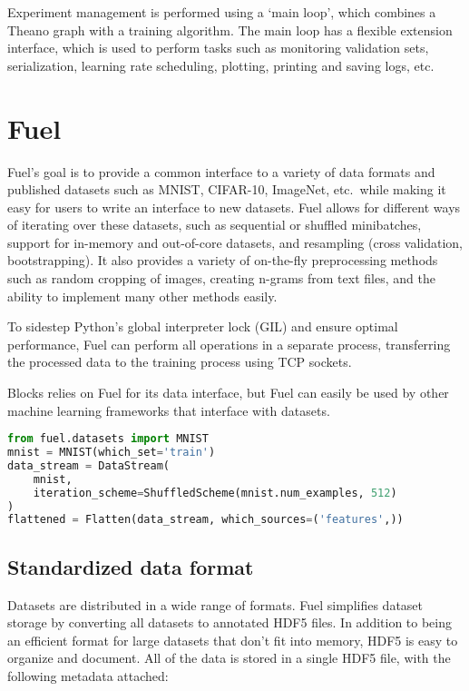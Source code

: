 \documentclass[twoside,11pt]{article}
\begin{document}
Experiment management is performed using a `main loop', which combines a Theano
graph with a training algorithm. The main loop has a flexible extension
interface, which is used to perform tasks such as monitoring validation sets,
serialization, learning rate scheduling, plotting, printing and saving logs,
etc.

\section{Fuel}

Fuel's goal is to provide a common interface to a variety of data formats and
published datasets such as MNIST, CIFAR-10, ImageNet, etc.\ while making it easy
for users to write an interface to new datasets. Fuel allows for different ways
of iterating over these datasets, such as sequential or shuffled minibatches,
support for in-memory and out-of-core datasets, and resampling (cross
validation, bootstrapping). It also provides a variety of on-the-fly
preprocessing methods such as random cropping of images, creating n-grams from
text files, and the ability to implement many other methods easily.

To sidestep Python's global interpreter lock (GIL) and ensure optimal
performance, Fuel can perform all operations in a separate process,
transferring the processed data to the training process using TCP sockets.

Blocks relies on Fuel for its data interface, but Fuel can easily be used by
other machine learning frameworks that interface with datasets.

\begin{lstlisting}[language=Python,basicstyle=\ttfamily,caption=Iterating over flattened MNIST features in shuffled batches]
from fuel.datasets import MNIST
mnist = MNIST(which_set='train')
data_stream = DataStream(
    mnist,
    iteration_scheme=ShuffledScheme(mnist.num_examples, 512)
)
flattened = Flatten(data_stream, which_sources=('features',))
\end{lstlisting}

\subsection{Standardized data format}

Datasets are distributed in a wide range of formats. Fuel simplifies dataset
storage by converting all datasets to annotated HDF5 files. In addition to being
an efficient format for large datasets that don't fit into memory, HDF5 is easy
to organize and document. All of the data is stored in a single HDF5 file, with
the following metadata attached:
\end{document}
